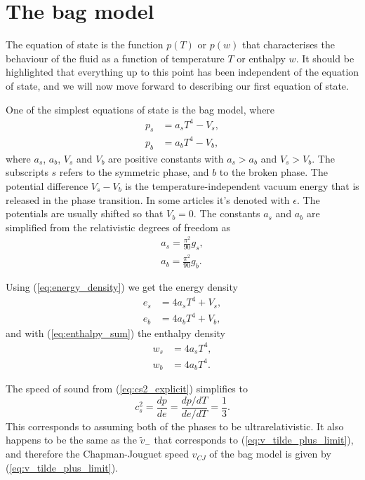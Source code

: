 \section{The bag model}
\label{bag_model}
The equation of state is the function $p(T)$ or $p(w)$ that characterises the behaviour of the fluid as a function of temperature $T$ or enthalpy $w$.
It should be highlighted that everything up to this point has been independent of the equation of state,
and we will now move forward to describing our first equation of state.

One of the simplest equations of state is the bag model, where
\cites[eq. 7.33]{lecture_notes}[eq. 8-9]{giese_2020}
\begin{align}
p_s &= a_s T^4 - V_s,
\label{eq:bag_ps} \\
p_b &= a_b T^4 - V_b,
\label{eq:bag_pb}
\end{align}
where $a_s$, $a_b$, $V_s$ and $V_b$ are positive constants with $a_s > a_b$ and $V_s > V_b$.
The subscripts $s$ refers to the symmetric phase, and $b$ to the broken phase.
The potential difference $V_s - V_b$ is the temperature-independent vacuum energy that is released in the phase transition.
In some articles it's denoted with $\epsilon$.
The potentials are usually shifted so that $V_b = 0$.
The constants $a_s$ and $a_b$ are simplified from the relativistic degrees of freedom as
\begin{align}
a_s = \frac{\pi^2}{90} g_s, \\
a_b = \frac{\pi^2}{90} g_b.
\end{align}

Using (\ref{eq:energy_density}) we get the energy density
\begin{align}
e_s &= 4 a_s T^4 + V_s, \\
e_b &= 4 a_b T^4 + V_b,
\end{align}
and with (\ref{eq:enthalpy_sum}) the enthalpy density
\begin{align}
w_s &= 4 a_s T^4, \\
w_b &= 4 a_b T^4.
\end{align}

The speed of sound from (\ref{eq:cs2_explicit}) simplifies to
\begin{equation}
c_s^2 = \frac{dp}{de} = \frac{dp/dT}{de/dT} = \frac{1}{3}.
\end{equation}
This corresponds to assuming both of the phases to be ultrarelativistic.
It also happens to be the same as the $\tilde{v}_-$ that corresponds to (\ref{eq:v_tilde_plus_limit}), and therefore the Chapman-Jouguet speed $v_{CJ}$ of the bag model is given by (\ref{eq:v_tilde_plus_limit}).

